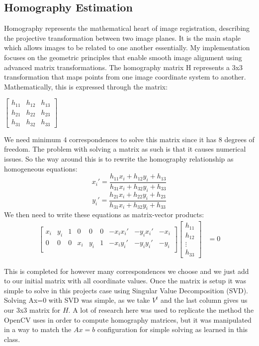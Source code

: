 \documentclass[12pt, letterpaper, ]{article}
\begin{document}
\subsection{Homography Estimation}
Homography represents the mathematical heart of image registration, describing the projective transformation between two image planes. It is the main staple which allows images to be related to one another essentially. My implementation focuses on the geometric principles that enable smooth image alignment using advanced matrix transformations.
The homography matrix H represents a 3x3 transformation that maps points from one image coordinate system to another. Mathematically, this is expressed through the matrix:
\begin{center}
    $\begin{bmatrix}
h_{11} & h_{12} & h_{13}\\
h_{21} & h_{22} & h_{23}\\
h_{31} & h_{32} & h_{33}
\end{bmatrix}$
\end{center}
We need minimum 4 correspondences to solve this matrix since it has 8 degrees of freedom. The problem with solving a matrix as such is that it causes numerical issues. So the way around this is to rewrite the homography relationship as homogeneous equations:
\[ x_i' = \frac{h_{11}x_i + h_{12}y_i + h_{13}}{h_{31}x_i + h_{32}y_i + h_{33}}\]
\[ y_i' = \frac{h_{21}x_i + h_{22}y_i + h_{23}}{h_{31}x_i + h_{32}y_i + h_{33}}\]
We then need to write these equations as matrix-vector products:
\begin{align*}
\begin{bmatrix}
x_i & y_i & 1 & 0 & 0 & 0 & -x_ix_i' & -y_ix_i' & -x_i\\
0 & 0 & 0 &x_i & y_i & 1 & -x_iy_i' & -y_iy_i' & -y_i\\
\end{bmatrix}
\begin{bmatrix}
  h_{11}  \\
  h_{12}  \\
  \vdots \\
  h_{33}
\end{bmatrix} 
{} &=0
\end{align*}

This is completed for however many correspondences we choose and we just add to our initial matrix with all coordinate values. Once the matrix is setup it was simple to solve in this projects case using Singular Value Decomposition (SVD). Solving Ax=0 with SVD was simple, as we take $V^t$ and the last column gives us our 3x3 matrix for $H$. A lot of research here was used to replicate the method the OpenCV uses in order to compute homography matrices, but it was manipulated in a way to match the $Ax=b$ configuration for simple solving as learned in this class.
\end{document}
